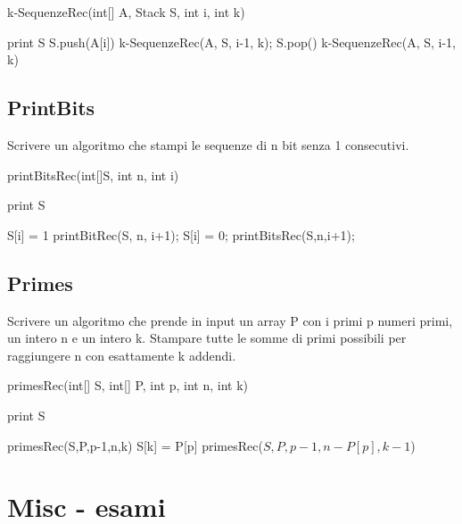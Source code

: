 \documentclass[oneside]{book}
\begin{document}
\begin{algorithm}
\caption{k-SequenzeRec(int[] A, Stack S, int i, int k)\label{alg:cap}}
\begin{algorithmic}

	\State print S
\Else
		\State S.push(A[i])
		\State k-SequenzeRec(A, S, i-1, k);
		\State S.pop()
	\EndIf
	\State k-SequenzeRec(A, S, i-1, k)

\EndIf
\end{algorithmic}
\end{algorithm}


\section{PrintBits}
Scrivere un algoritmo che stampi le sequenze di n bit senza 1 consecutivi.

\begin{algorithm}
\caption{printBitsRec(int[]S, int n, int i)\label{alg:cap}}
\begin{algorithmic}
	\State print S
\EndIf

	\State S[i] = 1
	\State printBitRec(S, n, i+1);
\Else
	\State S[i] = 0;
	\State printBitsRec(S,n,i+1);
\EndIf
\end{algorithmic}
\end{algorithm}
\newpage
\section{Primes}
Scrivere un algoritmo che prende in input un array P con i primi p numeri primi, un intero n e un intero k. Stampare tutte le somme di primi possibili per raggiungere n con esattamente k addendi. 

\begin{algorithm}
\caption{primesRec(int[] S, int[] P, int p, int n, int k)\label{alg:cap}}
\begin{algorithmic}
	\State print S
\EndIf

	\State primesRec(S,P,p-1,n,k)
	\State S[k] = P[p]
	\State primesRec($S,P,p-1,n-P[p],k-1$)
\EndIf
\end{algorithmic}
\end{algorithm}
\chapter{Misc - esami}
\end{document}
